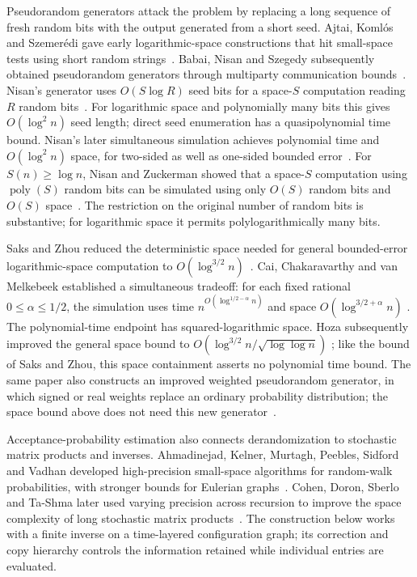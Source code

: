 Pseudorandom generators attack the problem by replacing a long sequence
of fresh random bits with the output generated from a short seed.
Ajtai, Koml\'os and Szemer\'edi gave early logarithmic-space
constructions that hit small-space tests using short random
strings~\cite{AjtaiKomlosSzemeredi1987}. Babai, Nisan and Szegedy
subsequently obtained pseudorandom generators through multiparty
communication bounds~\cite{BabaiNisanSzegedy1992}.
Nisan's generator uses $O(S\log R)$ seed bits for a space-$S$
computation reading $R$ random bits~\cite{Nisan1992}.
For logarithmic space and polynomially many bits this gives
$O(\log^2 n)$ seed length; direct seed enumeration has a
quasipolynomial time bound. Nisan's later simultaneous simulation
achieves polynomial time and $O(\log^2 n)$ space, for two-sided as
well as one-sided bounded error~\cite{Nisan1994RLinSC}.
For $S(n)\ge\log n$, Nisan and Zuckerman showed that a space-$S$
computation using $\operatorname{poly}(S)$ random bits can be simulated
using only $O(S)$ random bits and $O(S)$ space~\cite{NisanZuckerman1996}.
The restriction on the original number of random bits is substantive;
for logarithmic space it permits polylogarithmically many bits.

Saks and Zhou reduced the deterministic space needed for general
bounded-error logarithmic-space computation to
$O(\log^{3/2}n)$~\cite{SaksZhou1999}.
Cai, Chakaravarthy and van Melkebeek established a simultaneous
tradeoff: for each fixed rational $0\le\alpha\le1/2$, the simulation
uses time $n^{O(\log^{1/2-\alpha}n)}$ and space
$O(\log^{3/2+\alpha}n)$
\cite{CaiChakaravarthyVanMelkebeek2006}.
The polynomial-time endpoint has squared-logarithmic space.
Hoza subsequently improved the general space bound to
$O(\log^{3/2}n/\sqrt{\log\log n})$
\cite[Theorem~1.6 and Corollary~A.5]{Hoza2021}; like the bound of
Saks and Zhou, this space containment asserts no polynomial time bound.
The same paper also constructs an improved weighted pseudorandom
generator, in which signed or real weights replace an ordinary
probability distribution; the space bound above does not need this new
generator~\cite[Section~1.5]{Hoza2021}.

Acceptance-probability estimation also connects derandomization to
stochastic matrix products and inverses. Ahmadinejad, Kelner, Murtagh,
Peebles, Sidford and Vadhan developed high-precision small-space
algorithms for random-walk probabilities, with stronger bounds for
Eulerian graphs~\cite{AhmadinejadKelnerMurtaghPeeblesSidfordVadhan2020}.
Cohen, Doron, Sberlo and Ta-Shma later used varying precision across
recursion to improve the space complexity of long stochastic matrix
products~\cite{CohenDoronSberloTaShma2023}. The construction below
works with a finite inverse on a time-layered configuration graph;
its correction and copy hierarchy controls the information retained
while individual entries are evaluated.

